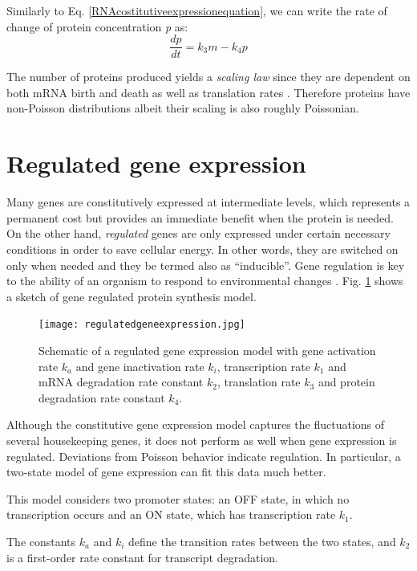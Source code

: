 \documentclass[12pt,a4paper]{report}
\begin{document}
Similarly to Eq. \ref{RNAcostitutiveexpressionequation}, we can write the rate of change of protein concentration \emph{p} as:
\begin{equation}\label{proteincostitutiveexpressionequation}
 \frac{dp}{dt} = k_{3}m - k_{4}p 
\end{equation}

The number of proteins produced yields a \emph{scaling law} since they are dependent on both mRNA birth and death as well as translation rates \cite{Article}. Therefore proteins have non-Poisson distributions albeit their scaling is also roughly Poissonian.

\section{Regulated gene expression}\label{regulatedgeneexpressionsection}
Many genes are constitutively expressed at intermediate levels, which represents a permanent cost but provides an immediate benefit when the protein is needed. On the other hand, \emph{regulated} genes are only expressed under certain necessary conditions in order to save cellular energy. In other words, they are switched on only when needed and they be termed also as ``inducible''. Gene regulation is key to the ability of an organism to respond to environmental changes \cite{generegulationNIH}. Fig. \ref{regulatedgeneexpression} shows a sketch of gene regulated protein synthesis model.

\begin{figure}[!ht]
\centering
\texttt{[image: regulatedgeneexpression.jpg]}
\caption{Schematic of a regulated gene expression model with gene activation rate $k_{a}$ and gene inactivation rate $k_{i}$, transcription rate $k_{1}$ and mRNA degradation rate constant $k_{2}$, translation rate $k_{3}$ and protein degradation rate constant $k_{4}$.}
\label{regulatedgeneexpression}
\end{figure}

Although the constitutive gene expression model captures the fluctuations of several housekeeping genes, it does not perform as well when gene expression is regulated. Deviations from Poisson behavior indicate regulation. In particular, a two-state model of gene expression can fit this data much better.

This model considers two promoter states: an OFF state, in which no transcription occurs and an ON state, which has transcription rate $k_{1}$. 

The constants $k_{a}$ and $k_{i}$ define the transition rates between the two states, and $k_{2}$ is a first-order rate constant for transcript degradation.
\end{document}
